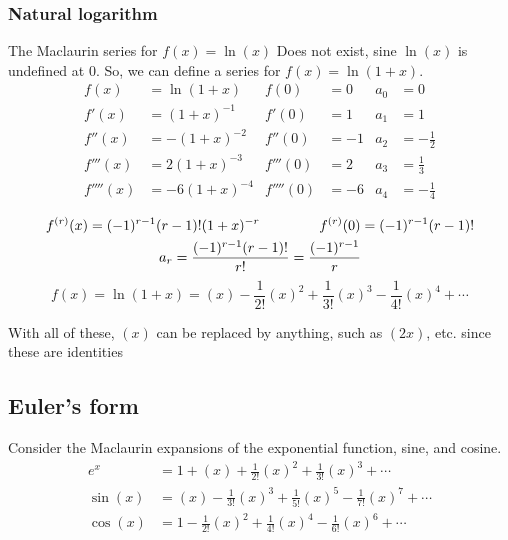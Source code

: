 \documentclass[11pt, a4paper]{article}
\begin{document}
\subsubsection*{Natural logarithm}
The Maclaurin series for $f(x)=\ln(x)$ Does not exist, sine $\ln(x)$ is undefined at $0$. So, we can define a series for $f(x)=\ln(1+x)$.
\begin{align*}
f(x)&=\ln(1+x) & f(0)&=0 & a_{0}&=0 \\
f'(x)&=(1+x)^{-1} & f'(0)&=1 & a_{1}&=1 \\
f''(x)&=-(1+x)^{-2} & f''(0)&=-1 & a_{2}&=-\frac{1}{2} \\
f'''(x)&=2(1+x)^{-3} & f'''(0)&=2 & a_{3}&=\frac{1}{3} \\
f''''(x)&=-6(1+x)^{-4} & f''''(0)&=-6 & a_{4}&=-\frac{1}{4} \\
\end{align*}
\vspace{-.8cm}
\begin{gather*}
f^{(r)}(x)=(-1)^{r-1}(r-1)!(1+x)^{-r} \hspace{1.5cm} f^{(r)}(0)=(-1)^{r-1}(r-1)! \\
 a_{r}=\frac{(-1)^{r-1}(r-1)!}{r!}=\frac{(-1)^{r-1}}{r}
\end{gather*}
\begin{equation*}
f(x)=\ln(1+x)=(x)-\frac{1}{2!}(x)^{2}+\frac{1}{3!}(x)^{3}-\frac{1}{4!}(x)^{4}+\cdots
\end{equation*}
\newline \par
\vspace{-.3cm}
With all of these, $(x)$ can be replaced by anything, such as $(2x)$, etc. since these are identities
\vspace{0.5cm}


\subsection{Euler's form}
\label{eulersform}
Consider the Maclaurin expansions of the exponential function, sine, and cosine.
\begin{align*}
e^{x}&=1+(x)+\frac{1}{2!}(x)^{2}+\frac{1}{3!}(x)^{3}+\cdots \\
\sin(x)&=(x)-\frac{1}{3!}(x)^{3}+\frac{1}{5!}(x)^{5}-\frac{1}{7!}(x)^{7}+\cdots \\
\cos(x)&=1-\frac{1}{2!}(x)^{2}+\frac{1}{4!}(x)^{4}-\frac{1}{6!}(x)^{6}+\cdots
\end{align*} \newline \par
\end{document}
